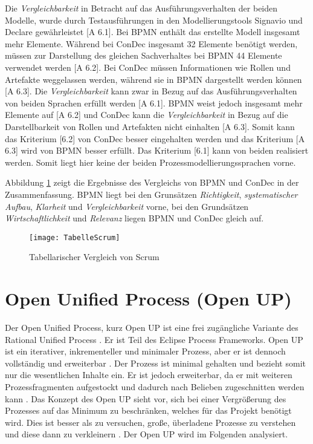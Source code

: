 Die \textit{Vergleichbarkeit} in Betracht auf das Ausführungsverhalten der beiden Modelle, wurde durch Testausführungen in den Modellierungstools Signavio und Declare gewährleistet [A 6.1].\newline
Bei BPMN enthält das erstellte Modell insgesamt mehr Elemente. Während bei ConDec insgesamt 32 Elemente benötigt werden, müssen zur Darstellung des gleichen Sachverhaltes bei BPMN 44 Elemente verwendet werden [A 6.2]. \newline
Bei ConDec müssen Informationen wie Rollen und Artefakte weggelassen werden, während sie in BPMN dargestellt werden können [A 6.3].\newline
Die \textit{Vergleichbarkeit} kann zwar in Bezug auf das Ausführungsverhalten von beiden Sprachen erfüllt werden [A 6.1]. BPMN weist jedoch insgesamt mehr Elemente auf [A 6.2] und ConDec kann die \textit{Vergleichbarkeit} in Bezug auf die Darstellbarkeit von Rollen und Artefakten nicht einhalten [A 6.3]. Somit kann das Kriterium [6.2] von ConDec besser eingehalten werden und das Kriterium [A 6.3] wird von BPMN besser erfüllt. Das Kriterium [6.1] kann von beiden realisiert werden. Somit liegt hier keine der beiden Prozessmodellierungssprachen vorne.\newline

Abbildung \ref{fig:TabelleScrum} zeigt die Ergebnisse des Vergleichs von BPMN und ConDec in der Zusammenfassung. BPMN liegt bei den Grunsätzen \textit{Richtigkeit}, \textit{systematischer Aufbau}, \textit{Klarheit} und \textit{Vergleichbarkeit} vorne, bei den Grundsätzen \textit{Wirtschaftlichkeit} und \textit{Relevanz} liegen BPMN und ConDec gleich auf. \newline

\begin{figure}[htp]
\begin{center}
  \texttt{[image: TabelleScrum]} %
  \caption{Tabellarischer Vergleich von Scrum}
  \label{fig:TabelleScrum}
\end{center}
\end{figure}




\section{Open Unified Process (Open UP)}


Der Open Unified Process, kurz Open UP ist eine frei zugängliche Variante des Rational Unified Process \cite{hauber2010}. Er ist Teil des Eclipse Process Frameworks. Open UP ist ein iterativer, inkrementeller und minimaler Prozess, aber er ist dennoch vollständig und erweiterbar \cite{Gau2006, Basem2010}. Der Prozess ist minimal gehalten und bezieht somit nur die wesentlichen Inhalte ein. Er ist jedoch erweiterbar, da er mit weiteren Prozessfragmenten aufgestockt und dadurch nach Belieben zugeschnitten werden kann \cite{opac}. Das Konzept des Open UP sieht vor, sich bei einer Vergrößerung des Prozesses auf das Minimum zu beschränken, welches für das Projekt benötigt wird. Dies ist besser als zu versuchen, große, überladene Prozesse zu verstehen und diese dann zu verkleinern \cite{ambler2012}. Der Open UP wird im Folgenden analysiert.

